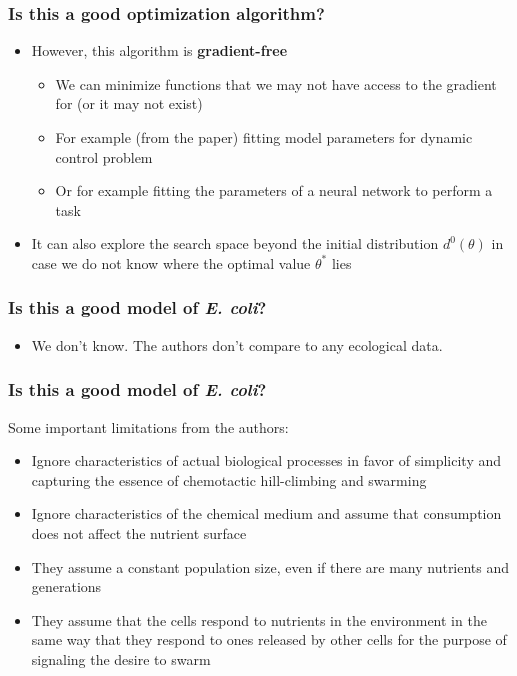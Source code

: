 \documentclass{beamer}
\begin{document}
\begin{frame}
\frametitle{Is this a good optimization algorithm?}
\begin{itemize}
  \item<1-> However, this algorithm is \textbf{gradient-free}
  \begin{itemize}
    \item<2-> We can minimize functions that we may not have access to the gradient for (or it may not exist)
    \item<2-> For example (from the paper) fitting model parameters for dynamic control problem
    \item<2-> Or for example fitting the parameters of a neural network to perform a task
  \end{itemize}
  \item<3-> It can also explore the search space beyond the initial distribution $d^0(\theta)$ in case we do not know where the optimal value $\theta^*$ lies
\end{itemize}
\end{frame}

\begin{frame}
\frametitle{Is this a good model of \textit{E. coli}?}
\begin{itemize}
  \item<2-> We don't know. The authors don't compare to any ecological data.
\end{itemize}
\end{frame}


\begin{frame}
\frametitle{Is this a good model of \textit{E. coli}?}
Some important limitations from the authors:
\begin{itemize}
  \item<1> Ignore characteristics of actual biological processes in favor of simplicity and capturing the essence of chemotactic hill-climbing and swarming
  \item<2> Ignore characteristics of the chemical medium and  assume that consumption does not affect the nutrient surface
  \item<3> They assume a constant population size, even if there are many nutrients and generations
  \item<4> They assume that the cells respond to nutrients in the environment in the same way that they respond to ones released by other cells for the purpose of signaling the desire to swarm
\end{itemize}
\end{frame}
\end{document}
